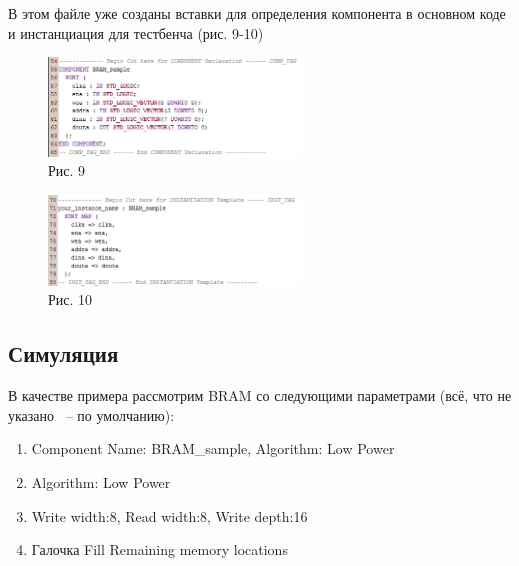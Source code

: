 В этом файле уже созданы вставки для определения компонента в основном коде и инстанциация для тестбенча (рис. 9-10)

\begin{figure}[h]
\centering
\includegraphics[width=0.6\textwidth]{9}
\caption{Рис. 9}
\label{9_label}
\end{figure}

\begin{figure}[h]
\centering
\includegraphics[width=0.6\textwidth]{10}
\caption{Рис. 10}
\label{10_label}
\end{figure}

\subsection{Симуляция}

В качестве примера рассмотрим BRAM со следующими параметрами (всё, что не указано ~-- по умолчанию):
\begin{enumerate}
\item Component Name: BRAM_sample, Algorithm: Low Power
\item Algorithm: Low Power
\item Write width:8, Read width:8, Write depth:16
\item Галочка Fill Remaining memory locations
\end{enumerate}

